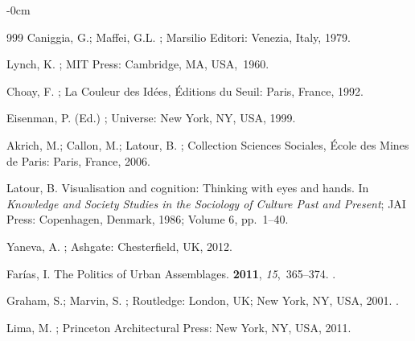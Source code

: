 \documentclass[land,article,accept,pdftex,oneauthor]{Definitions/mdpi}
\begin{document}
{\begin{adjustwidth}{-\extralength}{0cm}
\begin{thebibliography}{999}
Caniggia, G.; Maffei, G.L.
; Marsilio Editori: Venezia, Italy, 1979.

Lynch, K.
; MIT Press:  {Cambridge, MA, USA,}~1960.

Choay, F.
; La Couleur des Idées,
  Éditions du Seuil: Paris, France, 1992.

Eisenman, P. (Ed.)
; Universe: New York, NY, USA,
  1999.

Akrich, M.; Callon, M.; Latour, B.
; Collection
  {Sciences} {Sociales}, École des Mines de Paris: Paris, France,  2006. %


Latour, B.
\newblock Visualisation and cognition: Thinking with eyes and hands.
\newblock In {\em Knowledge and Society Studies in the Sociology of Culture Past
  and Present};  {JAI Press: Copenhagen, Denmark,} %
 {1986}; {Volume 6}, pp.~1--40.

Yaneva, A.
; Ashgate:  {Chesterfield, UK,}  2012.

Farías, I.
\newblock The {Politics} of {Urban} {Assemblages}.
 {\bf 2011}, {\em 15},~365--374.
.

Graham, S.; Marvin, S.
; Routledge:
  London, UK; New York, NY, USA, 2001.
.

Lima, M.
; Princeton
  Architectural Press: New York, NY, USA, 2011. %


\end{thebibliography}
\end{adjustwidth}}
\end{document}
